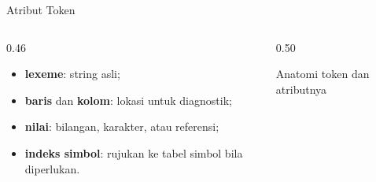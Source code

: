 \documentclass[aspectratio=169,10pt,t]{beamer}
\begin{document}
\begin{frame}{Atribut Token}
  \begin{columns}[T,onlytextwidth]
    \begin{column}{0.46\textwidth}
      \begin{itemize}
        \item \textbf{lexeme}: string asli;
        \item \textbf{baris} dan \textbf{kolom}: lokasi untuk
              diagnostik;
        \item \textbf{nilai}: bilangan, karakter, atau referensi;
        \item \textbf{indeks simbol}: rujukan ke tabel simbol bila
              diperlukan.
      \end{itemize}
    \end{column}
    \begin{column}{0.50\textwidth}
      \centering
      \par {\scriptsize Anatomi token dan atributnya}
    \end{column}
  \end{columns}
\end{frame}
\end{document}
